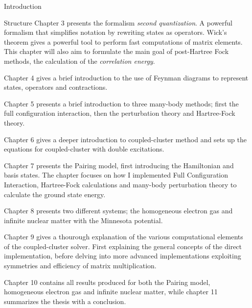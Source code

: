 \documentclass[twoside,english]{uiofysmaster}
\begin{document}
\begin{chapter}{Introduction}
\begin{subsection}{Structure}
		Chapter 3 presents the formalism \textit{second quantization}. A powerful formalism that simplifies notation by rewriting states as operators. Wick's theorem gives a powerful tool to perform fast computations of matrix elements. This chapter will also aim to formulate the main goal of post-Hartree Fock methods, the calculation of the \textit{correlation energy}. 

		Chapter 4 gives a brief introduction to the use of Feynman diagrams to represent states, operators and contractions.

		Chapter 5 presents a brief introduction to three many-body methods; first the full configuration interaction, then the perturbation theory and Hartree-Fock theory. 

		Chapter 6 gives a deeper introduction to coupled-cluster method and sets up the equations for coupled-cluster with double excitations. 

		Chapter 7 presents the Pairing model, first introducing the Hamiltonian and basis states. The chapter focuses on how I implemented Full Configuration Interaction, Hartree-Fock calculations and many-body perturbation theory to calculate the ground state energy. 

		Chapter 8 presents two different systems; the homogeneous electron gas and infinite nuclear matter with the Minnesota potential. 

		Chapter 9 gives a thourough explanation of the various computational elements of the coupled-cluster solver. First explaining the general concepts of the direct implementation, before delving into more advanced implementations exploiting symmetries and efficiency of matrix multiplication. 

		Chapter 10 contains all results produced for both the Pairing model, homogeneous electron gas and infinite nuclear matter, while chapter 11 summarizes the thesis with a conclusion. 
	\end{subsection}
\end{chapter}
\end{document}
